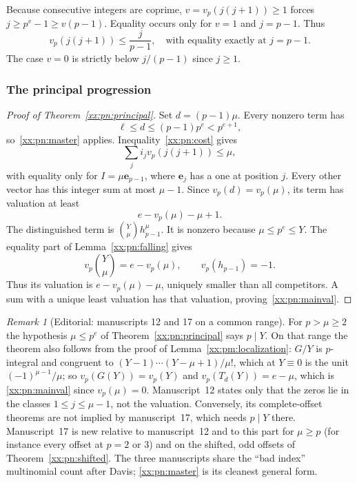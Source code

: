 \documentclass[11pt,a4paper]{article}
\numberwithin{equation}{section}
\theoremstyle{definition}
\theoremstyle{remark}
\newtheorem{remark}[theorem]{Remark}
\theoremstyle{plain}
\begin{document}
Because consecutive integers are coprime, $v=v_p(j(j+1))\ge1$ forces
$j\ge p^v-1\ge v(p-1)$. Equality occurs only for $v=1$ and $j=p-1$. Thus
\begin{equation}\label{xx:pn:cost}
 v_p(j(j+1))\le\frac{j}{p-1},
 \quad\text{with equality exactly at }j=p-1.
\end{equation}
The case $v=0$ is strictly below $j/(p-1)$ since $j\ge1$.

\subsubsection{The principal progression}

\begin{proof}[Proof of Theorem~\ref{xx:pn:principal}]
Set $d=(p-1)\mu$. Every nonzero term has
\[
 \ell\le d\le(p-1)p^e<p^{e+1},
\]
so~\eqref{xx:pn:master} applies. Inequality~\eqref{xx:pn:cost} gives
\[
 \sum_ji_jv_p(j(j+1))\le\mu,
\]
with equality only for $I=\mu\mathbf e_{p-1}$, where $\mathbf e_j$ has a one at
position $j$. Every other vector has this integer sum at most $\mu-1$. Since
$v_p(d)=v_p(\mu)$, its term has valuation at least
\[
 e-v_p(\mu)-\mu+1.
\]
The distinguished term is $\binom Y\mu h_{p-1}^\mu$. It is nonzero because
$\mu\le p^e\le Y$. The equality part of Lemma~\ref{xx:pn:falling} gives
\[
 v_p\binom Y\mu=e-v_p(\mu),\qquad v_p(h_{p-1})=-1.
\]
Thus its valuation is $e-v_p(\mu)-\mu$, uniquely smaller than all competitors. A
sum with a unique least valuation has that valuation,
proving~\eqref{xx:pn:mainval}.
\end{proof}

\begin{remark}[Editorial: manuscripts 12 and 17 on a common range]\label{xx:lc:rem:pm-pn}
For $p>\mu\ge2$ the hypothesis $\mu\le p^e$ of Theorem~\ref{xx:pn:principal}
says $p\mid Y$.  On that range the theorem also follows from the proof of
Lemma~\ref{xx:pm:localization}: $G/Y$ is $p$-integral and congruent to
$(Y-1)\cdots(Y-\mu+1)/\mu!$, which at $Y\equiv0$ is the unit
$(-1)^{\mu-1}/\mu$; so $v_p(G(Y))=v_p(Y)$ and $v_p(T_d(Y))=e-\mu$, which is
\eqref{xx:pn:mainval} since $v_p(\mu)=0$.  Manuscript~12 states only that the
zeros lie in the classes $1\le j\le\mu-1$, not the valuation.  Conversely, its
complete-offset theorems are not implied by manuscript~17, which needs $p\mid Y$
there.  Manuscript~17 is new relative to manuscript~12 and to this part for
$\mu\ge p$ (for instance every offset at $p=2$ or $3$) and on the shifted, odd
offsets of Theorem~\ref{xx:pn:shifted}.  The three manuscripts share the
``bad index'' multinomial count after Davis; \eqref{xx:pn:master} is its
cleanest general form.
\end{remark}
\end{document}
